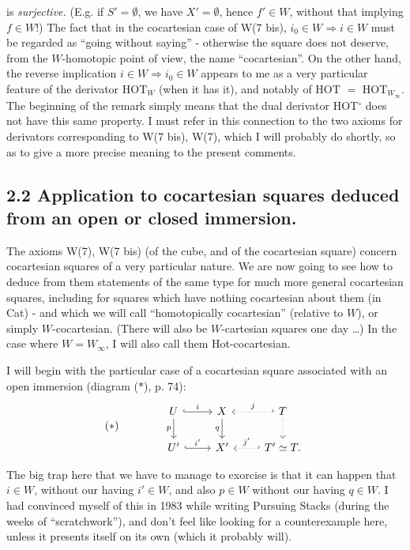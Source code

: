 \documentclass[11pt]{article}
\newcommand{\printedpage}[1]{\marginpar{\footnotesize p.~#1}}
\newcommand{\msp}[1]{\marginpar{\footnotesize [#1]}}
\begin{document}
\printedpage{58}

is \textit{surjective.} (E.g. if $S'=\emptyset$, we have $X'=\emptyset$, hence $f'\in W$, without that implying $f\in W$!) The fact that in the cocartesian case of W(7 bis), $i_0\in W\Longrightarrow i\in W$ must be regarded as ``going without saying'' - otherwise the square does not deserve, from the $W$-homotopic point of view, the name ``cocartesian''. On the other hand, the reverse implication $i\in W\Longrightarrow i_0\in W$ appears to me as a very particular feature of the derivator HOT$_W$ (when it has it), and notably %
of HOT $=$ HOT$_{W_\infty}$. The beginning
\msp{page 80}
of the remark simply means that the dual derivator HOT$^\circ$ does not have this same property. I must refer in this connection to the two axioms for derivators corresponding to W(7 bis), W(7), which I will probably do shortly, so as to give a more precise meaning to the present comments.

\subsection*{2.2 Application to cocartesian squares deduced from an open or closed immersion.}

The axioms W(7), W(7 bis) (of the cube, and of the cocartesian square) concern cocartesian squares of a very particular nature. We are now going to see how to deduce from them statements of the same type for much more general cocartesian squares, including for squares which have nothing cocartesian about them (in Cat) - and which we will call %
``homotopically cocartesian'' (relative to $W$), or simply $W$-cocartesian. (There will also be $W$-cartesian squares one day \dots) In the case where $W=W_\infty$, I will also call them Hot-cocartesian. %

I will begin with the particular case of a cocartesian square associated with an open immersion (diagram ($*$), p. 74):
\[
(*)\qquad\qquad
\begin{tikzcd}
U \arrow[r, hook, "i"] \arrow[d, "p"'] & X \arrow[d, "q"'] & T \arrow[l, hook', dotted, "j"'] \arrow[d, dotted] \\
U' \arrow[r, hook, "i'"] & X' & T'\simeq T. \arrow[l, hook', dotted, "j'"']
\end{tikzcd}
\]
\msp{page 81}

The big trap here that we have to manage to exorcise is that it can happen that $i\in W$, without our having $i'\in W$, and also $p\in W$ without our having $q\in W$. I had convinced myself of this in 1983 while writing Pursuing Stacks (during the weeks of ``scratchwork''), and don't feel like looking for a counterexample here, unless it presents itself on its own (which it probably will).
\end{document}
